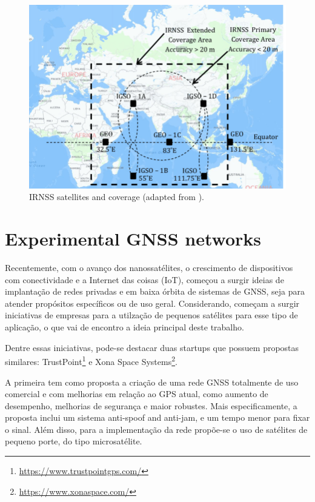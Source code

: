 \begin{figure}[!ht]
    \begin{center}
        \includegraphics[width=0.8\columnwidth]{figures/irnss}
        \caption{IRNSS satellites and coverage (adapted from \cite{thombre2015}).}
        \label{fig:irnss}
    \end{center}
\end{figure}

\section{Experimental GNSS networks}

Recentemente, com o avanço dos nanossatélites, o crescimento de dispositivos com conectividade e a Internet das coisas (IoT), começou a surgir ideias de implantação de redes privadas e em baixa órbita de sistemas de GNSS, seja para atender propósitos específicos ou de uso geral. Considerando, começam a surgir iniciativas de empresas para a utilzação de pequenos satélites para esse tipo de aplicação, o que vai de encontro a ideia principal deste trabalho.

Dentre essas iniciativas, pode-se destacar duas startups que possuem propostas similares: TrustPoint\footnote{\href{https://www.trustpointgps.com/}{https://www.trustpointgps.com/}} e Xona Space Systems\footnote{\href{https://www.xonaspace.com/}{https://www.xonaspace.com/}}.

A primeira tem como proposta a criação de uma rede GNSS totalmente de uso comercial e com melhorias em relação ao GPS atual, como aumento de desempenho, melhorias de segurança e maior robustes. Mais especificamente, a proposta inclui um sistema anti-spoof and anti-jam, e um tempo menor para fixar o sinal. Além disso, para a implementação da rede propõe-se o uso de satélites de pequeno porte, do tipo microsatélite.

